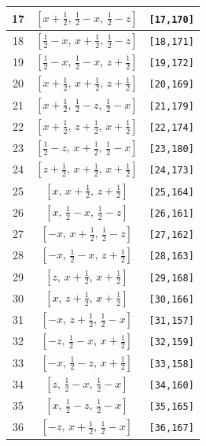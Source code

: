 \documentclass[fleqn,8pt]{jsarticle}
\begin{document}
\begin{longtable}{ccc}
17 & $\left[ x + \frac{1}{2},\, \frac{1}{2} - x,\, \frac{1}{2} - z \right]$ & {\tt [17,170]} \\ \hline
18 & $\left[ \frac{1}{2} - x,\, x + \frac{1}{2},\, \frac{1}{2} - z \right]$ & {\tt [18,171]} \\ \hline
19 & $\left[ \frac{1}{2} - x,\, \frac{1}{2} - x,\, z + \frac{1}{2} \right]$ & {\tt [19,172]} \\ \hline
20 & $\left[ x + \frac{1}{2},\, x + \frac{1}{2},\, z + \frac{1}{2} \right]$ & {\tt [20,169]} \\ \hline
21 & $\left[ x + \frac{1}{2},\, \frac{1}{2} - z,\, \frac{1}{2} - x \right]$ & {\tt [21,179]} \\ \hline
22 & $\left[ x + \frac{1}{2},\, z + \frac{1}{2},\, x + \frac{1}{2} \right]$ & {\tt [22,174]} \\ \hline
23 & $\left[ \frac{1}{2} - z,\, x + \frac{1}{2},\, \frac{1}{2} - x \right]$ & {\tt [23,180]} \\ \hline
24 & $\left[ z + \frac{1}{2},\, x + \frac{1}{2},\, x + \frac{1}{2} \right]$ & {\tt [24,173]} \\ \hline
25 & $\left[ x,\, x + \frac{1}{2},\, z + \frac{1}{2} \right]$ & {\tt [25,164]} \\ \hline
26 & $\left[ x,\, \frac{1}{2} - x,\, \frac{1}{2} - z \right]$ & {\tt [26,161]} \\ \hline
27 & $\left[ - x,\, x + \frac{1}{2},\, \frac{1}{2} - z \right]$ & {\tt [27,162]} \\ \hline
28 & $\left[ - x,\, \frac{1}{2} - x,\, z + \frac{1}{2} \right]$ & {\tt [28,163]} \\ \hline
29 & $\left[ z,\, x + \frac{1}{2},\, x + \frac{1}{2} \right]$ & {\tt [29,168]} \\ \hline
30 & $\left[ x,\, z + \frac{1}{2},\, x + \frac{1}{2} \right]$ & {\tt [30,166]} \\ \hline
31 & $\left[ - x,\, z + \frac{1}{2},\, \frac{1}{2} - x \right]$ & {\tt [31,157]} \\ \hline
32 & $\left[ - z,\, \frac{1}{2} - x,\, x + \frac{1}{2} \right]$ & {\tt [32,159]} \\ \hline
33 & $\left[ - x,\, \frac{1}{2} - z,\, x + \frac{1}{2} \right]$ & {\tt [33,158]} \\ \hline
34 & $\left[ z,\, \frac{1}{2} - x,\, \frac{1}{2} - x \right]$ & {\tt [34,160]} \\ \hline
35 & $\left[ x,\, \frac{1}{2} - z,\, \frac{1}{2} - x \right]$ & {\tt [35,165]} \\ \hline
36 & $\left[ - z,\, x + \frac{1}{2},\, \frac{1}{2} - x \right]$ & {\tt [36,167]} \\ \hline

\end{longtable}
\end{document}
